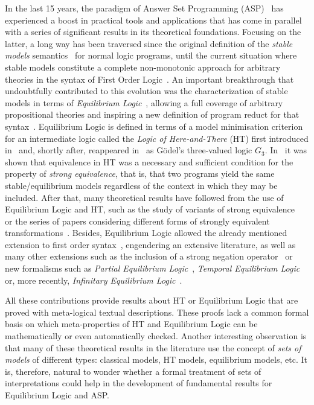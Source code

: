 \documentclass{tlp}
\begin{document}
In the last 15 years, the paradigm of Answer Set Programming (ASP)~\cite{MT99,Nie99,BET11} has experienced a boost in practical tools and applications that has come in parallel with a series of significant results in its theoretical foundations. Focusing on the latter, a long way has been traversed since the original definition of the \emph{stable models} semantics~\cite{GL88} for normal logic programs, until the current situation where stable models constitute a complete non-monotonic approach for arbitrary theories in the syntax of First Order Logic~\cite{PV04,FLL07}. An important breakthrough that undoubtfully contributed to this evolution was the characterization of stable models in terms of \emph{Equilibrium Logic}~\cite{Pea96,Pea06}, allowing a full coverage of arbitrary propositional theories and inspiring a new definition of program reduct for that syntax~\cite{Fer05}. Equilibrium Logic is defined in terms of a model minimisation criterion for an intermediate logic called the \emph{Logic of Here-and-There} (HT) first introduced in~\cite{Hey30} and, shortly after, reappeared in~\cite{God32} as G\"odel's three-valued logic $G_3$. In~\cite{LPV01} it was shown that equivalence in HT was a necessary and sufficient condition for the property of \emph{strong equivalence}, that is, that two programs yield the same stable/equilibrium models regardless of the context in which they may be included. After that, many theoretical results have followed from the use of Equilibrium Logic and HT, such as the study of variants of strong equivalence~\cite{PV04b,Wol08} or the series of papers considering different forms of strongly equivalent transformations~\cite{CPV05,CF07,CPV07}. Besides, Equilibrium Logic allowed the already mentioned extension to first order syntax~\cite{PV04}, engendering an extensive literature, as well as many other extensions such as the inclusion of a strong negation operator~\cite{OP05} or new formalisms such as \emph{Partial Equilibrium Logic}~\cite{COPV07b}, \emph{Temporal Equilibrium Logic}~\cite{ACD+13} or, more recently, \emph{Infinitary Equilibrium Logic}~\cite{HLPV14}.

All these contributions provide results about HT or Equilibrium Logic that are proved with meta-logical textual descriptions. These proofs lack a common formal basis on which meta-properties of HT and Equilibrium Logic can be mathematically or even automatically checked. Another interesting observation is that many of these theoretical results in the literature use the concept of \emph{sets of models} of different types: classical models, HT models, equilibrium models, etc. It is, therefore, natural to wonder whether a formal treatment of sets of interpretations could help in the development of fundamental results for Equilibrium Logic and ASP.
\end{document}
